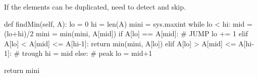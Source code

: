If the elements can be duplicated, need to detect and skip. 
\begin{python}
def findMin(self, A):
    lo = 0
    hi = len(A)
    mini = sys.maxint
    while lo < hi:
        mid = (lo+hi)/2
        mini = min(mini, A[mid])
        if A[lo] == A[mid]:  # JUMP
            lo += 1
        elif A[lo] < A[mid] <= A[hi-1]:
            return min(mini, A[lo])
        elif A[lo] > A[mid] <= A[hi-1]:  # trough
            hi = mid
        else:  # peak
            lo = mid+1

    return mini
\end{python}
